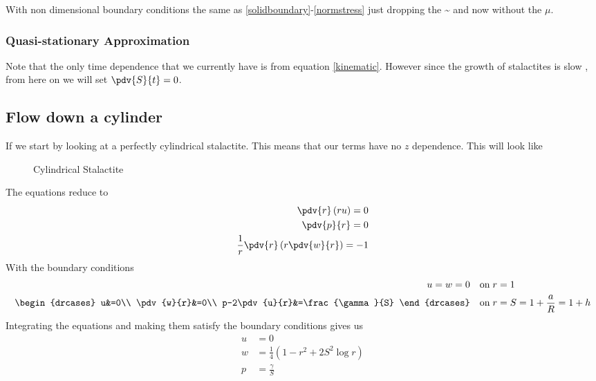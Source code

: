 \documentclass[12pt]{article}
\begin{document}
With non dimensional boundary conditions the same as \eqref{solidboundary}-\eqref{normstress} just dropping the \~{} and now without the $\mu$.
\subsubsection{Quasi-stationary Approximation}
Note that the only time dependence that we currently have is from equation \eqref{kinematic}. However since the growth of stalactites is slow \cite{short}, from here on we will set $\pdv{S}{t}=0$.
\subsection{Flow down a cylinder}
If we start by looking at a perfectly cylindrical stalactite. This means that our terms have no $z$ dependence. This will look like
\begin{figure}[H]
	\centering
	\caption{Cylindrical Stalactite}
\end{figure}
The equations reduce to
\begin{align}
\pdv{r}\left(ru\right)=0\\
\pdv{p}{r}=0\\
\frac{1}{r}\pdv{r}\left(r\pdv{w}{r}\right)=-1
\end{align}
With the boundary conditions
\begin{align}
u=w=0\quad &\mathrm{on} \; r=1\\
\begin{drcases}
u&=0\\
\pdv{w}{r}&=0\\
p-2\pdv{u}{r}&=\frac{\gamma}{S}
\end{drcases}
\quad& \mathrm{on} \; r=S=1+\frac{a}{R}=1+h
\end{align}
Integrating the equations and making them satisfy the boundary conditions gives us
\begin{align}
u&=0\label{baseu}\\
w&=\frac{1}{4}\left(1-r^2+2S^2\log r\right)\label{basew}\\
p&=\frac{\gamma}{ S}\label{basep}
\end{align}
\end{document}
